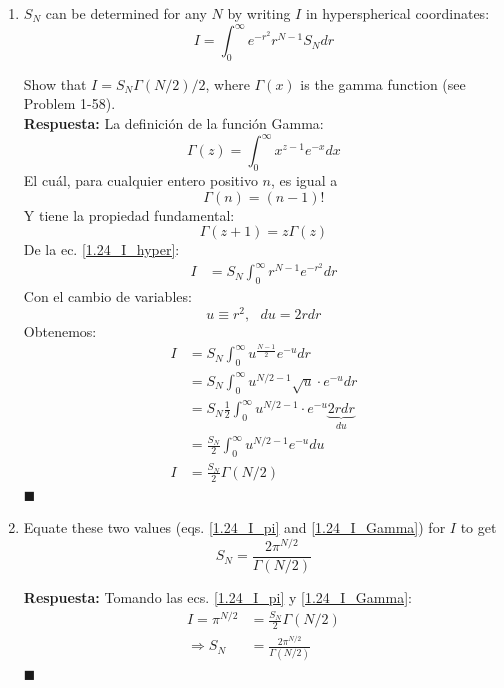 \documentclass[]{article}
\numberwithin{equation}{section}
\newcommand{\0}{\textcolor{gray}{0}}
\newcommand{\qed}{\hfill\(\blacksquare\)}
\begin{document}
\begin{enumerate}
	\item[c.] $S_N$ can be determined for any $N$ by writing $I$ in hyperspherical coordinates:
	\begin{equation}
		I = \int_0^{\infty} e^{-r^2} r^{N-1} S_N d r \label{1.24_I_hyper}
	\end{equation}
	
	Show that $I=S_N \Gamma(N / 2) / 2$, where $\Gamma(x)$ is the gamma function (see Problem 1-58).
	\\
	
	\textbf{Respuesta:}
	La definición de la función Gamma:
	\begin{equation}
		\Gamma(z) = \int_0^{\infty}x^{z-1} e^{-x} dx\label{Gamma}
	\end{equation}
	El cuál, para cualquier entero positivo \(n\), es igual a
	\begin{equation}
		\Gamma(n) = (n - 1)!\label{Gamma_factorial}
	\end{equation}
	Y tiene la propiedad fundamental:
	\begin{equation}
		\Gamma(z + 1) = z \Gamma(z)\label{Gamma_propiedad}
	\end{equation}
	De la ec. \ref{1.24_I_hyper}:
	\begin{align*}
		I &= S_N \int_0^{\infty} r^{N-1} e^{-r^2} d r
	\end{align*}
	Con el cambio de variables:
	\begin{equation*}
		u \equiv r^2,\ \ \ du = 2 r d r
	\end{equation*}
	Obtenemos:
	\begin{align}
		I &= S_N \int_0^{\infty} u^{\frac{N-1}{2}} e^{-u} d r\nonumber\\
		&= S_N \int_0^{\infty} u^{N/2 - 1}\sqrt{u}\cdot e^{-u} d r\nonumber\\
		&= S_N \frac{1}{2} \int_0^{\infty} u^{N/2 - 1}\cdot e^{-u} \underbrace{2 r d r}_{du}\nonumber\\
		&= \frac{S_N}{2} \int_0^{\infty} u^{N/2 - 1} e^{-u} du\nonumber\\
		I &= \frac{S_N}{2} \Gamma(N / 2)\label{1.24_I_Gamma}
	\end{align}
	\qed
	
	\item[d.] Equate these two values (eqs. \ref{1.24_I_pi} and \ref{1.24_I_Gamma}) for $I$ to get
	\begin{equation}
		S_N = \frac{2 \pi^{N / 2}}{\Gamma(N / 2)}
	\end{equation}
	
	\textbf{Respuesta:}
	Tomando las ecs. \ref{1.24_I_pi} y \ref{1.24_I_Gamma}:
	\begin{align*}
		I = \pi^{N/2} &= \frac{S_N}{2} \Gamma(N / 2)\\
		\Rightarrow S_N &= \frac{2 \pi^{N/2}}{\Gamma(N / 2)}
	\end{align*}
	\qed
	

\end{enumerate}
\end{document}
